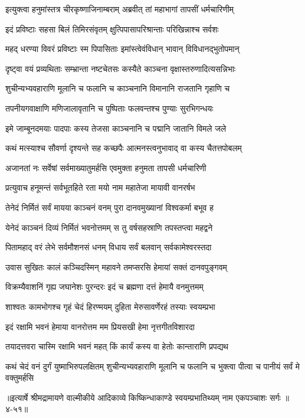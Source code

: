 
\twolineshloka
{इत्युक्त्वा हनुमांस्तत्र चीरकृष्णाजिनाम्बराम्}
{अब्रवीत् तां महाभागां तापसीं धर्मचारिणीम्} %

\twolineshloka
{इदं प्रविष्टाः सहसा बिलं तिमिरसंवृतम्}
{क्षुत्पिपासापरिश्रान्ताः परिखिन्नाश्च सर्वशः} %

\twolineshloka
{महद् धरण्या विवरं प्रविष्टाः स्म पिपासिताः}
{इमांस्त्वेवंविधान् भावान् विविधानद्भुतोपमान्} %

\twolineshloka
{दृष्ट्वा वयं प्रव्यथिताः सम्भ्रान्ता नष्टचेतसः}
{कस्यैते काञ्चना वृक्षास्तरुणादित्यसन्निभाः} %

\twolineshloka
{शुचीन्यभ्यवहाराणि मूलानि च फलानि च}
{काञ्चनानि विमानानि राजतानि गृहाणि च} %

\twolineshloka
{तपनीयगवाक्षाणि मणिजालावृतानि च}
{पुष्पिताः फलवन्तश्च पुण्याः सुरभिगन्धयः} %

\twolineshloka
{इमे जाम्बूनदमयाः पादपाः कस्य तेजसा}
{काञ्चनानि च पद्मानि जातानि विमले जले} %

\twolineshloka
{कथं मत्स्याश्च सौवर्णा दृश्यन्ते सह कच्छपैः}
{आत्मनस्त्वनुभावाद् वा कस्य चैतत्तपोबलम्} %

\twolineshloka
{अजानतां नः सर्वेषां सर्वमाख्यातुमर्हसि}
{एवमुक्ता हनुमता तापसी धर्मचारिणी} %

\twolineshloka
{प्रत्युवाच हनूमन्तं सर्वभूतहिते रता}
{मयो नाम महातेजा मायावी वानरर्षभ} %

\twolineshloka
{तेनेदं निर्मितं सर्वं मायया काञ्चनं वनम्}
{पुरा दानवमुख्यानां विश्वकर्मा बभूव ह} %

\twolineshloka
{येनेदं काञ्चनं दिव्यं निर्मितं भवनोत्तमम्}
{स तु वर्षसहस्राणि तपस्तप्त्वा महद्वने} %

\twolineshloka
{पितामहाद् वरं लेभे सर्वमौशनसं धनम्}
{विधाय सर्वं बलवान् सर्वकामेश्वरस्तदा} %

\twolineshloka
{उवास सुखितः कालं कञ्चिदस्मिन् महावने}
{तमप्सरसि हेमायां सक्तं दानवपुङ्गवम्} %

\twolineshloka
{विक्रम्यैवाशनिं गृह्य जघानेशः पुरन्दरः}
{इदं च ब्रह्मणा दत्तं हेमायै वनमुत्तमम्} %

\twolineshloka
{शाश्वतः कामभोगश्च गृहं चेदं हिरण्मयम्}
{दुहिता मेरुसावर्णेरहं तस्याः स्वयम्प्रभा} %

\twolineshloka
{इदं रक्षामि भवनं हेमाया वानरोत्तम}
{मम प्रियसखी हेमा नृत्तगीतविशारदा} %

\twolineshloka
{तयादत्तवरा चास्मि रक्षामि भवनं महत्}
{किं कार्यं कस्य वा हेतोः कान्ताराणि प्रपद्यथ} %

\threelineshloka
{कथं चेदं वनं दुर्गं युष्माभिरुपलक्षितम्}
{शुचीन्यभ्यवहाराणि मूलानि च फलानि च}
{भुक्त्वा पीत्वा च पानीयं सर्वं मे वक्तुमर्हसि} %


॥इत्यार्षे श्रीमद्रामायणे वाल्मीकीये आदिकाव्ये किष्किन्धाकाण्डे स्वयम्प्रभातिथ्यम् नाम एकपञ्चाशः सर्गः ॥४-५१॥
